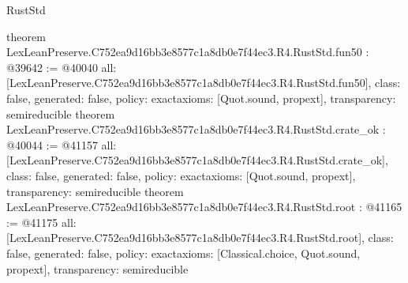 \begin{lexlean}{RustStd}
\begin{coremodule}
{}
theorem LexLeanPreserve.C752ea9d16bb3e8577c1a8db0e7f44ec3.R4.RustStd.fun50 : @39642 := @40040 {
  all: [LexLeanPreserve.C752ea9d16bb3e8577c1a8db0e7f44ec3.R4.RustStd.fun50],
  class: false,
  generated: false,
  policy: exact{axioms: [Quot.sound, propext]},
  transparency: semireducible
}
theorem LexLeanPreserve.C752ea9d16bb3e8577c1a8db0e7f44ec3.R4.RustStd.crate_ok : @40044 := @41157 {
  all: [LexLeanPreserve.C752ea9d16bb3e8577c1a8db0e7f44ec3.R4.RustStd.crate_ok],
  class: false,
  generated: false,
  policy: exact{axioms: [Quot.sound, propext]},
  transparency: semireducible
}
theorem LexLeanPreserve.C752ea9d16bb3e8577c1a8db0e7f44ec3.R4.RustStd.root : @41165 := @41175 {
  all: [LexLeanPreserve.C752ea9d16bb3e8577c1a8db0e7f44ec3.R4.RustStd.root],
  class: false,
  generated: false,
  policy: exact{axioms: [Classical.choice, Quot.sound, propext]},
  transparency: semireducible
}


\end{coremodule}
\end{lexlean}
